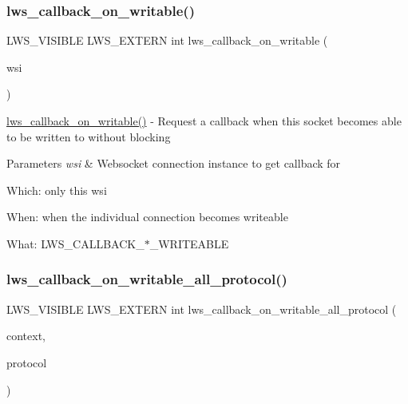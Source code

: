 \subsubsection{\texorpdfstring{lws\+\_\+callback\+\_\+on\+\_\+writable()}{lws\_callback\_on\_writable()}}
{\footnotesize\ttfamily L\+W\+S\+\_\+\+V\+I\+S\+I\+B\+LE L\+W\+S\+\_\+\+E\+X\+T\+E\+RN int lws\+\_\+callback\+\_\+on\+\_\+writable (\begin{DoxyParamCaption}\item[{struct \hyperlink{structlws}{lws} $\ast$}]{wsi }\end{DoxyParamCaption})}

\hyperlink{group__callback-when-writeable_ga941caaa468bc507b1cae52275f58800d}{lws\+\_\+callback\+\_\+on\+\_\+writable()} -\/ Request a callback when this socket becomes able to be written to without blocking


\begin{DoxyParams}{Parameters}
{\em wsi} & Websocket connection instance to get callback for\\
\hline
\end{DoxyParams}

\begin{DoxyItemize}
\item Which\+: only this wsi
\item When\+: when the individual connection becomes writeable
\item What\+: L\+W\+S\+\_\+\+C\+A\+L\+L\+B\+A\+C\+K\+\_\+$\ast$\+\_\+\+W\+R\+I\+T\+E\+A\+B\+LE 
\end{DoxyItemize}\mbox{\label{group__callback-when-writeable_gabbe4655c7eeb3eb1671b2323ec6b3107}} 
\subsubsection{\texorpdfstring{lws\+\_\+callback\+\_\+on\+\_\+writable\+\_\+all\+\_\+protocol()}{lws\_callback\_on\_writable\_all\_protocol()}}
{\footnotesize\ttfamily L\+W\+S\+\_\+\+V\+I\+S\+I\+B\+LE L\+W\+S\+\_\+\+E\+X\+T\+E\+RN int lws\+\_\+callback\+\_\+on\+\_\+writable\+\_\+all\+\_\+protocol (\begin{DoxyParamCaption}\item[{const struct \hyperlink{structlws__context}{lws\+\_\+context} $\ast$}]{context,  }\item[{const struct \hyperlink{structlws__protocols}{lws\+\_\+protocols} $\ast$}]{protocol }\end{DoxyParamCaption})}

